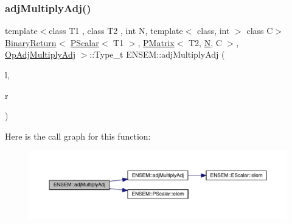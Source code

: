 \subsubsection{\texorpdfstring{adjMultiplyAdj()}{adjMultiplyAdj()}\hspace{0.1cm}{\footnotesize\ttfamily [2/3]}}
{\footnotesize\ttfamily template$<$class T1 , class T2 , int N, template$<$ class, int $>$ class C$>$ \\
\mbox{\hyperlink{structENSEM_1_1BinaryReturn}{Binary\+Return}}$<$ \mbox{\hyperlink{classENSEM_1_1PScalar}{P\+Scalar}}$<$ T1 $>$, \mbox{\hyperlink{classENSEM_1_1PMatrix}{P\+Matrix}}$<$ T2, \mbox{\hyperlink{operator__name__util_8cc_a7722c8ecbb62d99aee7ce68b1752f337}{N}}, C $>$, \mbox{\hyperlink{structENSEM_1_1OpAdjMultiplyAdj}{Op\+Adj\+Multiply\+Adj}} $>$\+::Type\+\_\+t E\+N\+S\+E\+M\+::adj\+Multiply\+Adj (\begin{DoxyParamCaption}\item[{const \mbox{\hyperlink{classENSEM_1_1PScalar}{P\+Scalar}}$<$ T1 $>$ \&}]{l,  }\item[{const \mbox{\hyperlink{classENSEM_1_1PMatrix}{P\+Matrix}}$<$ T2, \mbox{\hyperlink{operator__name__util_8cc_a7722c8ecbb62d99aee7ce68b1752f337}{N}}, C $>$ \&}]{r }\end{DoxyParamCaption})\hspace{0.3cm}{\ttfamily [inline]}}

Here is the call graph for this function\+:\nopagebreak
\begin{figure}[H]
\begin{center}
\leavevmode
\includegraphics[width=350pt]{df/d0a/group__primmatrix_ga5b52c2e633a016e706b74e388b8af102_cgraph}
\end{center}
\end{figure}
\mbox{\label{group__primmatrix_ga81c788e54ea0f4c4de97e7bfa9d7cd89}} 

